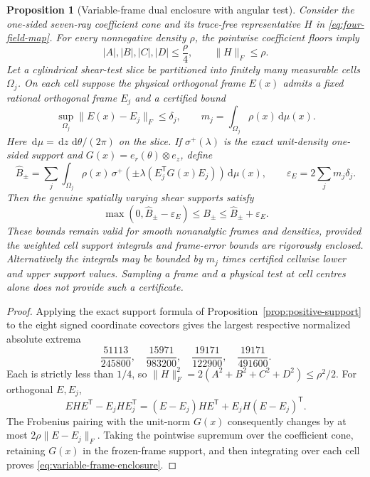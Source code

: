 \documentclass[11pt,a4paper]{article}
\theoremstyle{plain}
\newtheorem{proposition}[theorem]{Proposition}
\theoremstyle{definition}
\newcommand{\dd}{\,\mathrm{d}}
\newcommand{\norm}[1]{\lVert #1\rVert}
\begin{document}
\begin{proposition}[Variable-frame dual enclosure with angular test]
\label{prop:frame-enclosure}
Consider the one-sided seven-ray coefficient cone and its
trace-free representative $H$ in \eqref{eq:four-field-map}.
For every nonnegative density $\rho$, the pointwise coefficient
floors imply
\[
 |A|,|B|,|C|,|D|\le\frac{\rho}{4},
           \qquad \norm{H}_{F}\le\rho.
\]
Let a cylindrical shear-test slice be partitioned into finitely
many measurable cells $\Omega_j$. On each cell suppose the
physical orthogonal frame $E(x)$ admits a fixed rational
orthogonal frame $E_j$ and a \emph{certified} bound
\[
 \sup_{\Omega_j}\norm{E(x)-E_j}_{F}\le\delta_j,
 \qquad m_j=\int_{\Omega_j}\rho(x)\dd\mu(x).
\]
Here $\dd\mu=\dd z\,\dd\theta/(2\pi)$ on the slice. If
$\sigma^+(\lambda)$ is the exact unit-density one-sided support
and $G(x)=e_r(\theta)\otimes e_z$,
define
\[
 \widehat B_\pm=
 \sum_j\int_{\Omega_j}\rho(x)\,\sigma^+\!\left(
   \pm\lambda(E_j^{\mathsf T}G(x)E_j)\right)\dd\mu(x),
 \qquad
 \varepsilon_E=2\sum_jm_j\delta_j.
\]
Then the genuine spatially varying shear supports satisfy
\begin{equation}\label{eq:variable-frame-enclosure}
 \max(0,\widehat B_\pm-\varepsilon_E)
       \le B_\pm
       \le \widehat B_\pm+\varepsilon_E.
\end{equation}
These bounds remain valid for smooth nonanalytic frames and
densities, provided the weighted cell support integrals and
frame-error bounds are rigorously enclosed. Alternatively the
integrals may be bounded by $m_j$ times certified cellwise lower
and upper support values. Sampling a frame and a physical test
at cell centres alone does not provide such a certificate.
\end{proposition}

\begin{proof}
Applying the exact support formula of
Proposition~\ref{prop:positive-support} to the eight signed coordinate
covectors gives the largest respective normalized absolute
extrema
\[
 \frac{51113}{245800},\quad
 \frac{15971}{983200},\quad
 \frac{19171}{122900},\quad
 \frac{19171}{491600}.
\]
Each is strictly less than $1/4$, so
$\norm{H}_F^2=2(A^2+B^2+C^2+D^2)\le\rho^2/2$.
For orthogonal $E,E_j$,
\[
 EHE^{\mathsf T}-E_jHE_j^{\mathsf T}
 =(E-E_j)HE^{\mathsf T}
   +E_jH(E-E_j)^{\mathsf T}.
\]
The Frobenius pairing with the unit-norm $G(x)$ consequently changes
by at most $2\rho\norm{E-E_j}_F$. Taking the pointwise supremum
over the coefficient cone, retaining $G(x)$ in the frozen-frame
support, and then integrating over each cell proves
\eqref{eq:variable-frame-enclosure}.
\end{proof}
\end{document}

